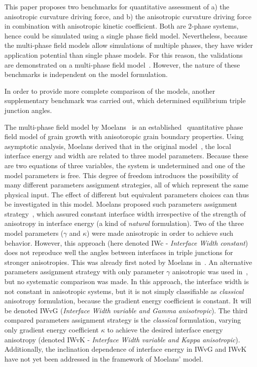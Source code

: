 This paper proposes two benchmarks for quantitative assessment of a) the anisotropic curvature driving force, and b) the anisotropic curvature driving force in combination with anisotropic kinetic coefficient. Both are 2-phase systems, hence could be simulated using a single phase field model. Nevertheless, because the multi-phase field models allow simulations of multiple phases, they have wider application potential than single phase models. For this reason, the validations are demonstrated on a multi-phase field model~\cite{Moelans2008}. However, the nature of these benchmarks is independent on the model formulation. 

In order to provide more complete comparison of the models, another supplementary benchmark was carried out, which determined equilibrium triple junction angles.

The multi-phase field model by Moelans~\cite{Moelans2008} is an established~\cite{Miyoshi2020} quantitative phase field model of grain growth with anisotoropic grain boundary properties. Using asymptotic analysis, Moelans derived that in the original model~\cite{Moelans2008}, the local interface energy and width are related to three model parameters. Because these are two equations of three variables, the system is undetermined and one of the model parameters is free. This degree of freedom introduces the possibility of many different parameters assignment strategies, all of which represent the same physical input. The effect of different but equivalent parameters choices can thus be investigated in this model. Moelans proposed such parameters assignment strategy~\cite{Moelans2008}, which assured constant interface width irrespective of the strength of anisotropy in interface energy (a kind of \textit{natural} formulation). Two of the three model parameters ($\gamma$ and $\kappa$) were made anisotropic in order to achieve such behavior. However, this approach (here denoted IWc - \textit{Interface Width constant}) does not reproduce well the angles between interfaces in triple junctions for stronger anisotropies. This was already first noted by Moelans in~\cite{Moelans2010}. An alternative parameters assignment strategy with only parameter $\gamma$ anisotropic was used in~\cite{Ravash2017,Miyoshi2020}, but no systematic comparison was made. In this approach, the interface width is not constant in anisotropic systems, but it is not simply classifiable as \textit{classical} anisotropy formulation, because the gradient energy coefficient is constant. It will be denoted IWvG (\textit{Interface Width variable and Gamma anisotropic}). The third compared parameters assignment strategy is the \textit{classical} formulation, varying only gradient energy coefficient $\kappa$ to achieve the desired interface energy anisotropy (denoted IWvK - \textit{Interface Width variable and Kappa anisotropic}). Additionally, the inclination dependence of interface energy in IWvG and IWvK have not yet been addressed in the framework of Moelans' model. 

